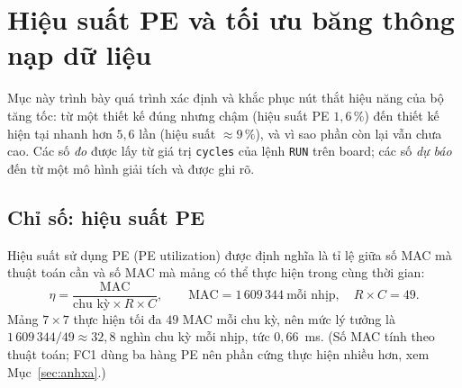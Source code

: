 \section{Hiệu suất PE và tối ưu băng thông nạp dữ liệu}\label{sec:bandwidth}
Mục này trình bày quá trình xác định và khắc phục nút thắt hiệu năng của bộ tăng tốc: từ một thiết kế đúng nhưng chậm (hiệu suất PE $1{,}6\,\%$) đến thiết kế hiện tại nhanh hơn $5{,}6$ lần (hiệu suất $\approx9\,\%$), và vì sao phần còn lại vẫn chưa cao.
Các số \emph{đo} được lấy từ giá trị \texttt{cycles} của lệnh \texttt{RUN} trên board; các số \emph{dự báo} đến từ một mô hình giải tích và được ghi rõ.

\subsection{Chỉ số: hiệu suất PE}
Hiệu suất sử dụng PE (PE utilization) được định nghĩa là tỉ lệ giữa số MAC mà thuật toán cần và số MAC mà mảng có thể thực hiện trong cùng thời gian:
\begin{equation}\label{eq:eta}
  \eta=\frac{\text{MAC}}{\text{chu kỳ}\times R\times C},\qquad
  \text{MAC}=1\,609\,344\ \text{mỗi nhịp},\quad R\times C=49.
\end{equation}
Mảng $7\times7$ thực hiện tối đa $49$ MAC mỗi chu kỳ, nên mức lý tưởng là $1\,609\,344/49\approx32{,}8$ nghìn chu kỳ mỗi nhịp, tức $0{,}66$~ms.
(Số MAC tính theo thuật toán; FC1 dùng ba hàng PE nên phần cứng thực hiện nhiều hơn, xem Mục~\ref{sec:anhxa}.)

